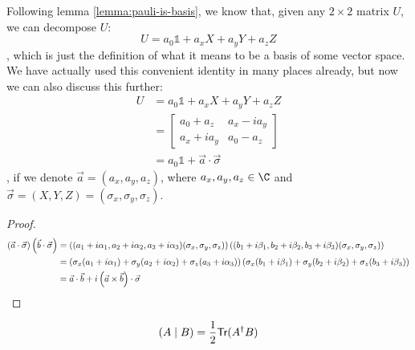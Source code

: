 \documentclass[12pt]{article}
\begin{document}
\begin{theorem}
Following lemma \ref{lemma:pauli-is-basis}, we know that, given any $2\times 2$ matrix $U$, we can decompose $U$: $$
U = a_0\mathbb{1} + a_xX + a_yY + a_zZ
$$, which is just the definition of what it means to be a basis of some vector space. We have actually used this convenient identity in many places already, but now we can also discuss this further: $$
\begin{aligned}
U
    &= a_0\mathbb{1} + a_xX + a_yY + a_zZ\\
    &= \begin{bmatrix}
        a_0 + a_z & a_x - i a_y\\
        a_x + ia_y & a_0 - a_z
    \end{bmatrix}\\
    &= a_0\mathbb{1} + \vec{a}\cdot \vec{\sigma}
\end{aligned}
$$, if we denote $\vec{a} = (a_x, a_y, a_z)$, where $a_x, a_y, a_z\in \C$ and $\vec{\sigma} = (X,Y,Z) = (\sigma_x, \sigma_y, \sigma_z)$.
\end{theorem}

\begin{proposition}[$\prt{\vec{a}\cdot \vec{\sigma}}\prt{\vec{b}\cdot \vec{\sigma}} = \prt{\vec{a} \cdot \vec{b}} + i\prt{\vec{a}\times \vec{b}} \cdot \vec{\sigma}$]
\end{proposition}
\begin{proof}
$$
\begin{aligned}
\left(\vec{a}\cdot \vec{\sigma}\right)\left(\vec{b}\cdot \vec{\sigma}\right)
    &= \left((a_1 + i\alpha_1, a_2 + i\alpha_2, a_3 + i\alpha_3)(\sigma_x, \sigma_y, \sigma_z)\right) \left((b_1 + i\beta_1, b_2 + i\beta_2, b_3 + i\beta_3)(\sigma_x, \sigma_y, \sigma_z)\right)\\
    &= \left(\sigma_x(a_1 + i\alpha_1) + \sigma_y(a_2 + i\alpha_2) + \sigma_z(a_3 + i\alpha_3)\right)\left(\sigma_x(b_1 + i\beta_1) + \sigma_y(b_2 + i\beta_2) + \sigma_z(b_3 + i\beta_3)\right)\\
    &= \vec{a}\cdot \vec{b} + i\left(\vec{a}\times \vec{b}\right)\cdot \vec{\sigma}
\end{aligned}
$$
\end{proof}

\begin{definition}
$$
(A\mid B) = \frac{1}{2}\textsf{Tr}(A^\dag B)
$$
\end{definition}
\end{document}
